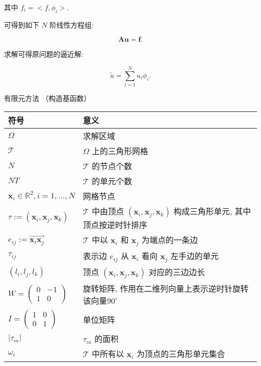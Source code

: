 \documentclass{article}
\begin{document}
其中 $ f_i=<f,\phi_i>$. 

可得到如下 $N$ 阶线性方程组:

$$
\mathbf{Au} = \mathbf{f}.
$$

求解可得原问题的逼近解:

$$
\tilde u = \sum\limits_{i=1}^N u_i\phi_i.
$$

{\large 有限元方法 （构造基函数）}


\begin{tabular}{ |l|l| }   
\hline
符号&意义\\
\hline
$\Omega$ & 求解区域\\
\hline
$\mathcal{T}$ & $\Omega$ 上的三角形网格 \\
\hline
$N$ & $\mathcal{T}$ 的节点个数 \\
\hline
$NT$ & $\mathcal{T}$ 的单元个数  \\
\hline
$\mathbf x_i\in\mathbb{R}^2,i=1,\ldots,N$  &  网格节点 \\
\hline
$\tau := (\mathbf x_i,\mathbf x_j,\mathbf x_k)$ & $\mathcal T$ 中由顶点 $(\mathbf x_i,\mathbf x_j,\mathbf x_k)$ 构成三角形单元, 其中顶点按逆时针排序 \\
\hline
$e_{ij} := \overrightarrow{\mathbf x_i\mathbf x_j}$ & $\mathcal T$ 中以 $\mathbf x_i$ 和 $\mathbf x_j$ 为端点的一条边 \\
\hline 
$\tau_{ij}$ & 表示边 $e_{ij}$ 从 $\mathbf x_i$ 看向 $\mathbf x_j$ 左手边的单元 \\
\hline
$(l_i, l_j, l_k)$ & 顶点 $(\mathbf x_i,\mathbf x_j,\mathbf x_k)$ 对应的三边边长 \\
\hline
$W=\begin{pmatrix}0&-1\\1 & 0 \end{pmatrix}$ & 旋转矩阵, 作用在二维列向量上表示逆时针旋转该向量$90^\circ$  \\
\hline 
$I=\begin{pmatrix} 1 & 0\\ 0& 1 \end{pmatrix}$  & 单位矩阵 \\
\hline
$|\tau_m|$ &  $\tau_m$ 的面积 \\
\hline
 $\omega_i$  & $\mathcal T$ 中所有以 $\mathbf x_i$ 为顶点的三角形单元集合 \\
\hline 
\end{tabular}
\end{document}
